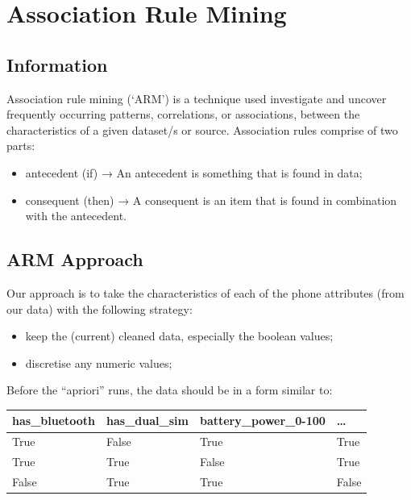 \documentclass[11pt]{article}
\providecommand{\tightlist}{%
      \setlength{\itemsep}{0pt}\setlength{\parskip}{0pt}}
\begin{document}
    \hypertarget{association-rule-mining}{%
\section{Association Rule Mining}\label{association-rule-mining}}

\hypertarget{information}{%
\subsection{Information}\label{information}}

Association rule mining (`ARM') is a technique used investigate and
uncover frequently occurring patterns, correlations, or associations,
between the characteristics of a given dataset/s or source. Association
rules comprise of two parts:

\begin{itemize}
\tightlist
\item
  antecedent (if) → An antecedent is something that is found in data;
\item
  consequent (then) → A consequent is an item that is found in
  combination with the antecedent.
\end{itemize}

    \hypertarget{arm-approach}{%
\subsection{ARM Approach}\label{arm-approach}}

Our approach is to take the characteristics of each of the phone
attributes (from our data) with the following strategy:

\begin{itemize}
\tightlist
\item
  keep the (current) cleaned data, especially the boolean values;
\item
  discretise any numeric values;
\end{itemize}

Before the ``apriori'' runs, the data should be in a form similar to:

\begin{longtable}[]{@{}llll@{}}
\toprule
has\_bluetooth & has\_dual\_sim & battery\_power\_0-100 &
\ldots{}\tabularnewline
\midrule
\endhead
True & False & True & True\tabularnewline
True & True & False & True\tabularnewline
False & True & True & False\tabularnewline
\bottomrule
\end{longtable}
\end{document}
